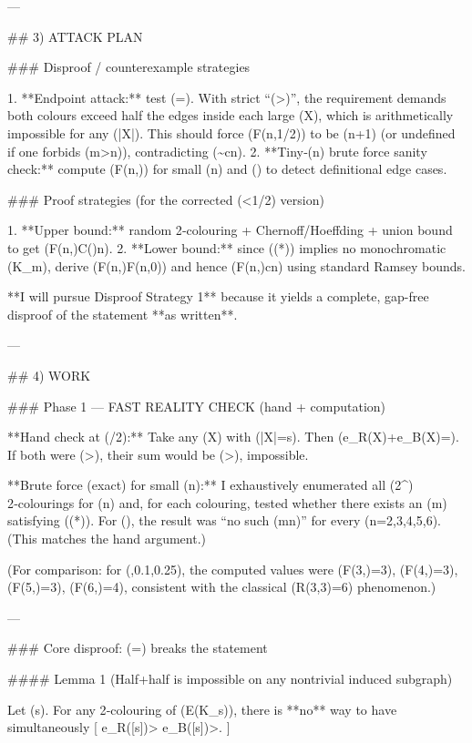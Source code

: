 ---

## 3) ATTACK PLAN

### Disproof / counterexample strategies

1. **Endpoint attack:** test (\alpha=). With strict “(>)”, the requirement demands both colours exceed half the edges inside each large (X), which is arithmetically impossible for any (|X|). This should force (F(n,1/2)) to be (n+1) (or undefined if one forbids (m>n)), contradicting (\sim c\log n).
2. **Tiny‑(n) brute force sanity check:** compute (F(n,\alpha)) for small (n) and (\alpha) to detect definitional edge cases.

### Proof strategies (for the corrected (\alpha<1/2) version)

1. **Upper bound:** random 2‑colouring + Chernoff/Hoeffding + union bound to get (F(n,\alpha)\le C(\alpha)\log n).
2. **Lower bound:** since ((*)) implies no monochromatic (K_m), derive (F(n,\alpha)\ge F(n,0)) and hence (F(n,\alpha)\ge c\log n) using standard Ramsey bounds.

**I will pursue Disproof Strategy 1** because it yields a complete, gap-free disproof of the statement **as written**.

---

## 4) WORK

### Phase 1 — FAST REALITY CHECK (hand + computation)

**Hand check at (/2):**
Take any (X) with (|X|=s). Then (e_R(X)+e_B(X)=). If both were (>), their sum would be (>), impossible.

**Brute force (exact) for small (n):**
I exhaustively enumerated all (2^{}) 2‑colourings for (n) and, for each colouring, tested whether there exists an (m) satisfying ((*)).
For (), the result was “no such (m\le n)” for every (n=2,3,4,5,6). (This matches the hand argument.)

(For comparison: for (,0.1,0.25), the computed values were (F(3,\alpha)=3), (F(4,\alpha)=3), (F(5,\alpha)=3), (F(6,\alpha)=4), consistent with the classical (R(3,3)=6) phenomenon.)

---

### Core disproof: (\alpha=) breaks the statement

#### Lemma 1 (Half+half is impossible on any nontrivial induced subgraph)

Let (s). For any 2‑colouring of (E(K_s)), there is **no** way to have simultaneously
[
e_R([s])>
\quad{}\quad
e_B([s])>.
]

